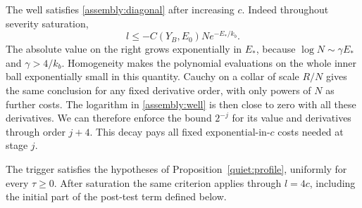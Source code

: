 The well satisfies \eqref{assembly:diagonal} after increasing $c$.
Indeed throughout severity saturation,
\begin{equation}\label{assembly:activation-gap}
 l\leq-C(Y_B,E_0)N e^{-E_*/k_b}.
\end{equation}
The absolute value on the right grows exponentially in $E_*$,
because $\log N\sim\gamma E_*$ and $\gamma>4/k_b$.
Homogeneity makes the polynomial evaluations on the whole inner
ball exponentially small in this quantity. Cauchy on a collar
of scale $R/N$ gives the same conclusion for any fixed derivative
order, with only powers of $N$ as further costs. The logarithm in
\eqref{assembly:well} is then close to zero with all these
derivatives. We can therefore enforce the bound $2^{-j}$ for its
value and derivatives through order $j+4$. This decay pays all
fixed exponential-in-$c$ costs needed at stage $j$.

\begin{lemma}\label{assembly:quiet-check}
The trigger satisfies the hypotheses of
Proposition~\ref{quiet:profile}, uniformly for every $\tau\geq0$.
After saturation the same criterion applies through $l=4c$, including
the initial part of the post-test term defined below.
\end{lemma}

